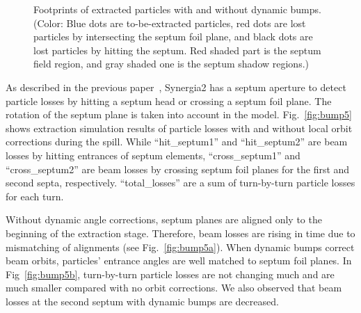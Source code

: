 \documentclass[aps,prstab,onecolumn,preprint]{revtex4-1}
\begin{document}
\begin{figure}[!tbp]
  \caption{\label{fig:bump4}Footprints of extracted particles with and without dynamic bumps. (Color: Blue dots are to-be-extracted particles, red dots are lost particles by intersecting the septum foil plane, and black dots are lost particles by hitting the septum. Red shaded part is the septum field region, and gray shaded one is the septum shadow regions.)}
\end{figure}

As described in the previous paper~\cite{mu2e}, Synergia2 has a septum aperture to detect particle losses by hitting a septum head or crossing a septum foil plane. The rotation of the septum plane is taken into account in the model. Fig.~\ref{fig:bump5} shows extraction simulation results of particle losses with and without local orbit corrections during the spill. While ``hit\_septum1'' and ``hit\_septum2'' are beam losses by hitting entrances of septum elements, ``cross\_septum1'' and ``cross\_septum2'' are beam losses by crossing septum foil planes for the first and second septa, respectively. ``total\_losses'' are a sum of turn-by-turn particle losses for each turn.

Without dynamic angle corrections, septum planes are aligned only to the beginning of the extraction stage. Therefore, beam losses are rising in time due to mismatching of alignments (see Fig.~\ref{fig:bump5a}). When dynamic bumps correct beam orbits, particles' entrance angles are well matched to septum foil planes. In Fig~\ref{fig:bump5b}, turn-by-turn particle losses are not changing much and are much smaller compared with no orbit corrections. We also observed that beam losses at the second septum with dynamic bumps are decreased.
\end{document}
